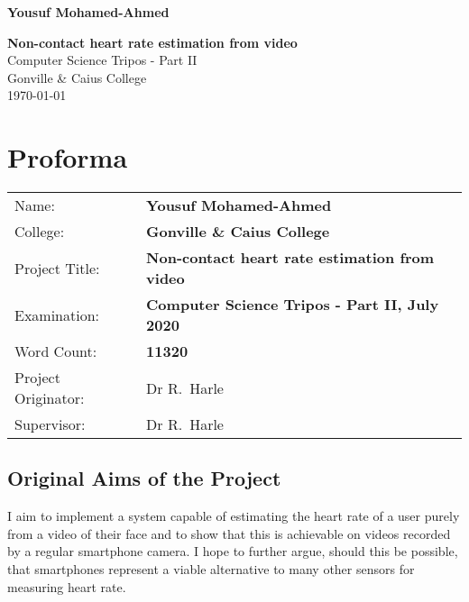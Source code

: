 \documentclass[12pt,twoside,notitlepage]{report}
\begin{document}





\pagestyle{empty}

\hfill{\LARGE \bf Yousuf Mohamed-Ahmed}

\vspace*{60mm}
\begin{center}
\Huge
{\bf Non-contact heart rate estimation from video} \\
\vspace*{5mm}
Computer Science Tripos - Part II  \\
\vspace*{5mm}
Gonville \& Caius College\\
\vspace*{5mm}
\today  %
\end{center}

\cleardoublepage


\setcounter{page}{1}
\pagestyle{plain}

\chapter*{Proforma}

{\large
\begin{tabular}{ll}
Name:               & \bf Yousuf Mohamed-Ahmed \\
College:            & \bf Gonville \& Caius College                     \\
Project Title:      & \bf Non-contact heart rate estimation from video \\
Examination:        & \bf Computer Science Tripos - Part II, July 2020    \\
Word Count:         & \bf 11320\footnotemark[1] \\
Project Originator: & Dr R.~Harle                    \\
Supervisor:         & Dr R.~Harle                    \\ 
\end{tabular}
}


\section*{Original Aims of the Project}
 I aim to implement a system capable of estimating the heart rate of a user purely from a video of their face and to show that this is achievable
on videos recorded by a regular smartphone camera. I hope to further argue, should this be possible, that smartphones represent a viable 
alternative to many other sensors for measuring heart rate.
\end{document}
